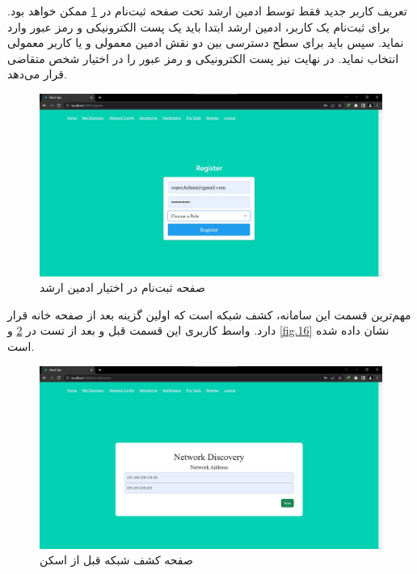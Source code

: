 \newpage

تعریف کاربر جدید فقط توسط ادمین ارشد تحت صفحه ثبت‌نام در \cref{fig.14} ممکن خواهد بود. برای ثبت‌نام یک کاربر، ادمین ارشد ابتدا باید یک پست الکترونیکی و رمز عبور وارد نماید. سپس باید برای سطح دسترسی بین دو نقش ادمین معمولی و یا کاربر معمولی انتخاب نماید. در نهایت نیز پست الکترونیکی و رمز عبور را در اختیار شخص متقاضی قرار می‌دهد.


\begin{figure}[!h]
    \centering\includegraphics[scale=.38]{./register}
    \caption{صفحه ثبت‌نام در اختیار ادمین ارشد}\label{fig.14}
\end{figure}


مهم‌ترین قسمت این سامانه، کشف شبکه است که اولین گزینه بعد از صفحه خانه قرار دارد. واسط کاربری این قسمت قبل و بعد از تست در \cref{fig.15} و \cref{fig.16} نشان داده شده‌ است. 


\begin{figure}[!h]
    \centering\includegraphics[scale=.38]{./net-dis-before}
    \caption{صفحه کشف شبکه قبل از اسکن}\label{fig.15}
\end{figure}


